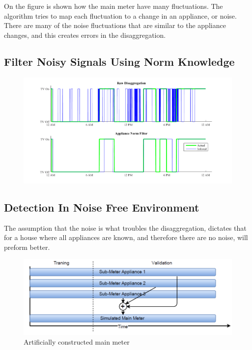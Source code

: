 On the figure is shown how the main meter have many fluctuations. The algorithm tries to map each fluctuation to a change in an appliance, or noise. There are many of the noise fluctuations that are similar to the appliance changes, and this creates errors in the disaggregation. 

\subsection{Filter Noisy Signals Using Norm Knowledge }
\label{sec:NormFilter}

\begin{figure}[H]
\centering
\includegraphics[width=1\textwidth]{billeder/AppNormFilterH10.png}
\caption{}
\end{figure}



\subsection{Detection In Noise Free Environment }
\label{sec:NOISEFREE}
The assumption that the noise is what troubles the disaggregation, dictates that for a house where all appliances are known, and therefore there are no noise, will preform better. 

\begin{figure}[H]
\centering
\includegraphics[width=1\textwidth]{billeder/SimIllu.png}
\caption{Artificially constructed main meter}
\label{fig:SIL}
\end{figure}

